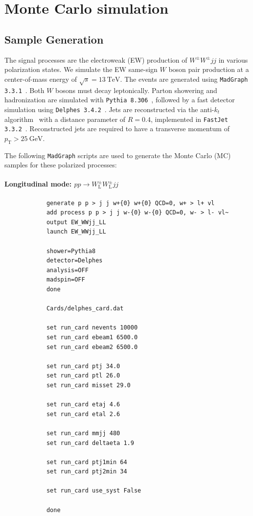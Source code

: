 \documentclass[12pt]{article}
\begin{document}
\section{Monte Carlo simulation}%
\label{sec:monte_carlo_simulation}

    \subsection{Sample Generation}%
    \label{sub:sample_generation}
        The signal processes are the electroweak (EW) production of $W^{\pm}W^{\pm}jj$ in various polarization states. We simulate the EW same-sign $W$ boson pair production at a center-of-mass energy of $\sqrt{s} = 13~\text{TeV}$. The events are generated using \verb|MadGraph 3.3.1|~\cite{Alwall:2014hca}. Both $W$ bosons must decay leptonically. Parton showering and hadronization are simulated with \verb|Pythia 8.306|~\cite{Sjostrand:2014zea}, followed by a fast detector simulation using \verb|Delphes 3.4.2|~\cite{deFavereau:2013fsa}. Jets are reconstructed via the anti-$k_t$ algorithm~\cite{Cacciari:2008gp} with a distance parameter of $R = 0.4$, implemented in \verb|FastJet 3.3.2|~\cite{Cacciari:2011ma}. Reconstructed jets are required to have a transverse momentum of $p_{\text{T}} > 25~\text{GeV}$.

        The following \verb|MadGraph| scripts are used to generate the Monte Carlo (MC) samples for these polarized processes:

        \paragraph{Longitudinal mode: $pp \to W^{\pm}_{\text{L}}W^{\pm}_{\text{L}} jj$}
        \begin{lstlisting}
            generate p p > j j w+{0} w+{0} QCD=0, w+ > l+ vl
            add process p p > j j w-{0} w-{0} QCD=0, w- > l- vl~
            output EW_WWjj_LL
            launch EW_WWjj_LL

            shower=Pythia8
            detector=Delphes
            analysis=OFF
            madspin=OFF
            done

            Cards/delphes_card.dat

            set run_card nevents 10000
            set run_card ebeam1 6500.0
            set run_card ebeam2 6500.0

            set run_card ptj 34.0
            set run_card ptl 26.0
            set run_card misset 29.0

            set run_card etaj 4.6
            set run_card etal 2.6

            set run_card mmjj 480
            set run_card deltaeta 1.9

            set run_card ptj1min 64
            set run_card ptj2min 34

            set run_card use_syst False

            done
        \end{lstlisting}
\end{document}
